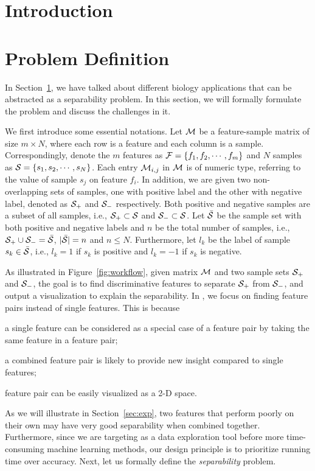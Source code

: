 

\section{Introduction}
\label{sec:intro}





\section{Problem Definition}\label{sec:prob}
In Section~\ref{sec:intro}, we have talked about different biology applications that can be abstracted as a separability problem. In this section, we will formally formulate the problem and discuss the challenges in it. 

We first introduce some essential notations. Let $\mathcal{M}$ be a feature-sample matrix of size $m\times N$, where each row is a feature and each column is a sample. Correspondingly, denote the $m$ features as $\mathcal{F}=\{f_1,f_2,\cdots,f_m\}$ and $N$ samples as $\mathcal{S}=\{s_1,s_2,\cdots,s_N\}$. Each entry $\mathcal{M}_{i,j}$ in $\mathcal{M}$ is of numeric type, referring to the value of sample $s_j$ on feature $f_i$. In addition, we are given two non-overlapping sets of samples, one with positive label and the other with negative label, denoted as $\mathcal{S}_+$ and $\mathcal{S}_-$ respectively. Both positive and negative samples are a subset of all samples, i.e., $\mathcal{S}_+\subset \mathcal{S}$ and $\mathcal{S}_-\subset \mathcal{S}$. Let $\bar{\mathcal{S}}$ be the sample set with both positive and negative labels and $n$ be the total number of samples, i.e., $\mathcal{S}_+\cup \mathcal{S}_- = \bar{\mathcal{S}}$, $|\bar{\mathcal{S}}| = n$ and $n\leq N$. Furthermore, let $l_k$ be the label of sample $s_k\in \bar{\mathcal{S}}$, i.e., $l_k=1$ if $s_k$ is positive and $l_k=-1$ if $s_k$ is negative. 

As illustrated in Figure~\ref{fig:workflow}, given matrix $\mathcal{M}$ and two sample sets $\mathcal{S}_+$ and $\mathcal{S}_-$, the goal is to find discriminative features to separate $\mathcal{S}_+$ from $\mathcal{S}_-$, and output a visualization to explain the separability. In \genviz, we focus on finding \topk feature pairs instead of \topk single features. This is because \begin{inparaenum}
\item a single feature can be considered as a special case of a feature pair by taking the same feature in a feature pair;
\item a combined feature pair is likely to provide new insight compared to single features;
\item feature pair can be easily visualized as a 2-D space.
\end{inparaenum}
As we will illustrate in Section~\ref{sec:exp}, two features that perform poorly on their own may have very good separability when combined together. Furthermore, since we are targeting as a data exploration tool before more time-consuming machine learning methods, our design principle is to prioritize running time over accuracy. Next, let us formally define the \textit{separability} problem. 

